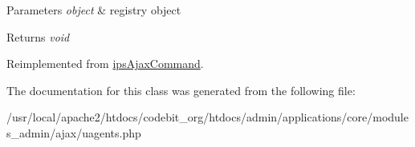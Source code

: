 \begin{DoxyParams}{Parameters}
{\em object} & registry object \\
\hline
\end{DoxyParams}
\begin{DoxyReturn}{Returns}
{\itshape void} 
\end{DoxyReturn}


Reimplemented from \hyperlink{classips_ajax_command_afbc4e912a0604b94d47d66744c64d8ba}{ips\-Ajax\-Command}.



The documentation for this class was generated from the following file\-:\begin{DoxyCompactItemize}
\item 
/usr/local/apache2/htdocs/codebit\-\_\-org/htdocs/admin/applications/core/modules\-\_\-admin/ajax/uagents.\-php\end{DoxyCompactItemize}
